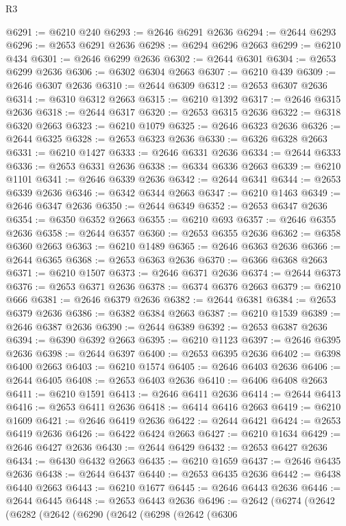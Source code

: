 \begin{lexlean}{R3}
\begin{coremodule}
@6291 := @6210 @240
@6293 := @2646 @6291 @2636
@6294 := @2644 @6293
@6296 := @2653 @6291 @2636
@6298 := @6294 @6296 @2663
@6299 := @6210 @434
@6301 := @2646 @6299 @2636
@6302 := @2644 @6301
@6304 := @2653 @6299 @2636
@6306 := @6302 @6304 @2663
@6307 := @6210 @439
@6309 := @2646 @6307 @2636
@6310 := @2644 @6309
@6312 := @2653 @6307 @2636
@6314 := @6310 @6312 @2663
@6315 := @6210 @1392
@6317 := @2646 @6315 @2636
@6318 := @2644 @6317
@6320 := @2653 @6315 @2636
@6322 := @6318 @6320 @2663
@6323 := @6210 @1079
@6325 := @2646 @6323 @2636
@6326 := @2644 @6325
@6328 := @2653 @6323 @2636
@6330 := @6326 @6328 @2663
@6331 := @6210 @1427
@6333 := @2646 @6331 @2636
@6334 := @2644 @6333
@6336 := @2653 @6331 @2636
@6338 := @6334 @6336 @2663
@6339 := @6210 @1101
@6341 := @2646 @6339 @2636
@6342 := @2644 @6341
@6344 := @2653 @6339 @2636
@6346 := @6342 @6344 @2663
@6347 := @6210 @1463
@6349 := @2646 @6347 @2636
@6350 := @2644 @6349
@6352 := @2653 @6347 @2636
@6354 := @6350 @6352 @2663
@6355 := @6210 @693
@6357 := @2646 @6355 @2636
@6358 := @2644 @6357
@6360 := @2653 @6355 @2636
@6362 := @6358 @6360 @2663
@6363 := @6210 @1489
@6365 := @2646 @6363 @2636
@6366 := @2644 @6365
@6368 := @2653 @6363 @2636
@6370 := @6366 @6368 @2663
@6371 := @6210 @1507
@6373 := @2646 @6371 @2636
@6374 := @2644 @6373
@6376 := @2653 @6371 @2636
@6378 := @6374 @6376 @2663
@6379 := @6210 @666
@6381 := @2646 @6379 @2636
@6382 := @2644 @6381
@6384 := @2653 @6379 @2636
@6386 := @6382 @6384 @2663
@6387 := @6210 @1539
@6389 := @2646 @6387 @2636
@6390 := @2644 @6389
@6392 := @2653 @6387 @2636
@6394 := @6390 @6392 @2663
@6395 := @6210 @1123
@6397 := @2646 @6395 @2636
@6398 := @2644 @6397
@6400 := @2653 @6395 @2636
@6402 := @6398 @6400 @2663
@6403 := @6210 @1574
@6405 := @2646 @6403 @2636
@6406 := @2644 @6405
@6408 := @2653 @6403 @2636
@6410 := @6406 @6408 @2663
@6411 := @6210 @1591
@6413 := @2646 @6411 @2636
@6414 := @2644 @6413
@6416 := @2653 @6411 @2636
@6418 := @6414 @6416 @2663
@6419 := @6210 @1609
@6421 := @2646 @6419 @2636
@6422 := @2644 @6421
@6424 := @2653 @6419 @2636
@6426 := @6422 @6424 @2663
@6427 := @6210 @1634
@6429 := @2646 @6427 @2636
@6430 := @2644 @6429
@6432 := @2653 @6427 @2636
@6434 := @6430 @6432 @2663
@6435 := @6210 @1659
@6437 := @2646 @6435 @2636
@6438 := @2644 @6437
@6440 := @2653 @6435 @2636
@6442 := @6438 @6440 @2663
@6443 := @6210 @1677
@6445 := @2646 @6443 @2636
@6446 := @2644 @6445
@6448 := @2653 @6443 @2636
@6496 := @2642
    (@6274
      (@2642
        (@6282
          (@2642
            (@6290
              (@2642
                (@6298
                  (@2642
                    (@6306

\end{coremodule}
\end{lexlean}
